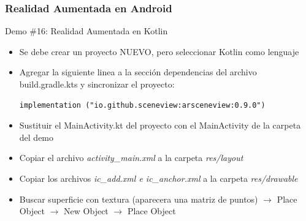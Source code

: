 \documentclass[aspectratio=169,compress]{beamer}
\begin{document}
\begin{frame}[fragile]
\frametitle{Realidad Aumentada en Android}
\begin{block}{Demo \#16: Realidad Aumentada en Kotlin}

\begin{itemize}
\item Se debe crear un proyecto NUEVO, pero seleccionar Kotlin como lenguaje
\item Agregar la siguiente linea a la sección dependencias del archivo build.gradle.kts y sincronizar el proyecto: 
\begin{verbatim}
implementation ("io.github.sceneview:arsceneview:0.9.0")
\end{verbatim}
\item Sustituir el MainActivity.kt del proyecto con el MainActivity de la carpeta del demo
\item Copiar el archivo \textit{activity\_main.xml} a la carpeta \textit{res/layout}
\item Copiar los archivos \textit{ic\_add.xml e ic\_anchor.xml} a la carpeta \textit{res/drawable}
\item Buscar superficie con textura (aparecera una matriz de puntos) $\rightarrow$ Place Object $\rightarrow$ New Object $\rightarrow$ Place Object
\end{itemize}

\end{block}
\end{frame}
\end{document}
